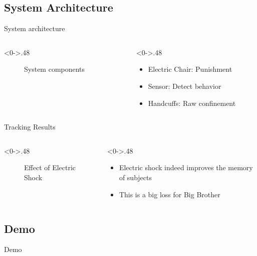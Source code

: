\documentclass[UTF8,10pt,aspectratio=43]{ctexbeamer}
\begin{document}
\subsection{System Architecture}
\begin{frame}{System architecture}
\begin{columns}[T] %
\begin{column}<0->{.48\textwidth}
\begin{figure}[thpb]
\centering
\resizebox{1\linewidth}{!}{
}
\caption{System components}
\label{fig:system}
\end{figure}
\end{column}%
\hfill%
\begin{column}<0->{.48\textwidth}
\begin{itemize}
\item Electric Chair: Punishment
\item Sensor: Detect behavior
\item Handcuffs: Raw confinement
\end{itemize}
\end{column}%
\end{columns}
\end{frame}
\begin{frame}{Tracking Results}
\begin{columns}[T] %
\begin{column}<0->{.48\textwidth}
\begin{figure}[thpb]
\centering
\resizebox{\linewidth}{!}{
}
\caption{Effect of Electric Shock}
\label{fig:stimulus}
\end{figure}
\end{column}
\begin{column}<0->{.48\textwidth}
\begin{itemize}
\item Electric shock indeed improves the memory of subjects
\item This is a big loss for Big Brother
\end{itemize}
\end{column}
\end{columns}
\end{frame}
\subsection{Demo}  %
\begin{frame}{Demo}

\end{frame}
\end{document}

